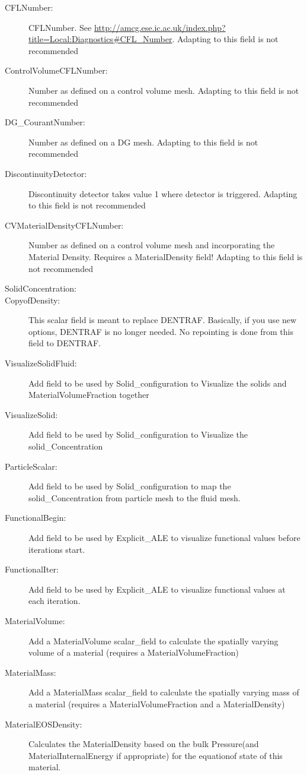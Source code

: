 \begin{description}
\item[CFLNumber:]CFLNumber. See \url{http://amcg.ese.ic.ac.uk/index.php?title=Local:Diagnostics\#CFL\_Number}.
	Adapting to this field is not recommended  
\item[ControlVolumeCFLNumber:]Number as defined on a control volume mesh. Adapting to this field is not recommended  
\item[DG\_CourantNumber:]Number as defined on a DG mesh. Adapting to this field is not recommended  
\item[DiscontinuityDetector:]Discontinuity detector takes value 1 where detector is triggered.
	Adapting to this field is not recommended  
\item[CVMaterialDensityCFLNumber:]Number as defined on a control volume mesh and incorporating the Material Density. Requires a MaterialDensity field!
Adapting to this field is not recommended  
\item[SolidConcentration:]  
\item[CopyofDensity:]This scalar field is meant to replace DENTRAF. Basically, if you use new options, DENTRAF is no longer needed. No repointing is done from this field to DENTRAF.  
\item[VisualizeSolidFluid:]Add field to be used by Solid\_configuration to Visualize the solids and MaterialVolumeFraction together  
\item[VisualizeSolid:]Add field to be used by Solid\_configuration to Visualize the solid\_Concentration  
\item[ParticleScalar:]Add field to be used by Solid\_configuration to map  the solid\_Concentration from particle mesh to the fluid mesh.  
\item[FunctionalBegin:]Add field to be used by Explicit\_ALE to visualize functional values before iterations start.  
\item[FunctionalIter:]Add field to be used by Explicit\_ALE to visualize functional values at each iteration.  
\item[MaterialVolume:]Add a MaterialVolume scalar\_field to calculate the spatially varying volume of a material (requires a MaterialVolumeFraction)  
\item[MaterialMass:]Add a MaterialMass scalar\_field to calculate the spatially varying mass of a material (requires a MaterialVolumeFraction and a MaterialDensity)  
\item[MaterialEOSDensity:]Calculates the MaterialDensity based on the bulk Pressure(and MaterialInternalEnergy if appropriate) for the equationof state of this material.  

\end{description}
